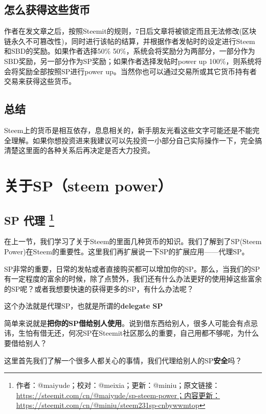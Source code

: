 \documentclass[]{ctexbook}
\begin{document}
\subsection{怎么获得这些货币}

作者在发文章之后，按照Steemit的规则，7日后文章将被锁定而且无法修改(区块链永久不可篡改性)，同时进行该帖的结算，并根据作者发帖时的设定进行Steem和SBD的奖励。如果作者选择50\% 50\%，系统会将奖励分为两部分，一部分作为SBD奖励，另一部分作为SP奖励；如果作者选择发帖时power up 100\%，则系统将会将奖励全部按照SP进行power up。当然你也可以通过交易所或其它货币持有者交易来获得这些货币。

\subsection{总结}

Steem上的货币是相互依存，息息相关的，新手朋友光看这些文字可能还是不能完全理解。如果你想投资进来我建议可以先投资一小部分自己实际操作一下，完全搞清楚这里面的各种关系后再决定是否大力投资。

\hypertarget{about-sp}{%
\section{关于SP（steem power）}\label{about-sp}}

\hypertarget{sp-}{%
\subsection[SP 代理 ]{\texorpdfstring{SP 代理 \footnote{作者：@maiyude；校对：@meixia；更新：@miniu；原文链接：\url{https://steemit.com/cn/@maiyude/sp-steem-power；内容更新：https://steemit.com/cn/@miniu/steem231sp-cnbywwmtop}}}{SP 代理 }}\label{sp-}}

在上一节，我们学习了关于Steem的里面几种货币的知识。我们了解到了SP(Steem Power)在Steem的重要性。这里我们再扩展说一下SP的扩展应用------代理SP。

SP非常的重要，日常的发帖或者直接购买都可以增加你的SP。那么，当我们的SP有一定程度的富余的时候，除了点赞外，我们还有什么办法更好的使用掉这些富余的SP呢？或者我想要快速的获得更多的SP，有什么办法呢？

这个办法就是代理SP，也就是所谓的\textbf{delegate SP}

简单来说就是\textbf{把你的SP借给别人使用}。说到借东西给别人，很多人可能会有点忌讳，生怕有借无还，何况SP在Steemit社区那么的重要，自己用都不够呢，为什么要借给别人？

这里首先我们了解一个很多人都关心的事情，我们代理给别人的SP\textbf{安全}吗？
\end{document}
